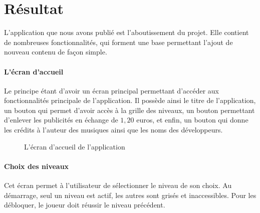 \section{Résultat}

L'application que nous avons publié est l'aboutissement du projet. Elle contient de nombreuses fonctionnalités, qui forment une base permettant l'ajout de nouveau contenu de façon simple.

\paragraph{L'écran d'accueil} Le principe étant d'avoir un écran principal permettant d'accéder aux fonctionnalités principale de l'application. Il possède ainsi le titre de l'application, un bouton qui permet d'avoir accès à la grille des niveaux, un bouton permettant d'enlever les publicités en échange de $1,20$ euros, et enfin, un bouton qui donne les crédits à l'auteur des musiques ainsi que les noms des développeurs.

\begin{figure}[H]\centering
  \caption{L'écran d'accueil de l'application}
  \label{analytics}
\end{figure}

\paragraph{Choix des niveaux} Cet écran permet à l'utilisateur de sélectionner le niveau de son choix. Au démarrage, seul un niveau est actif, les autres sont grisés et inaccessibles. Pour les débloquer, le joueur doit réussir le niveau précédent.

